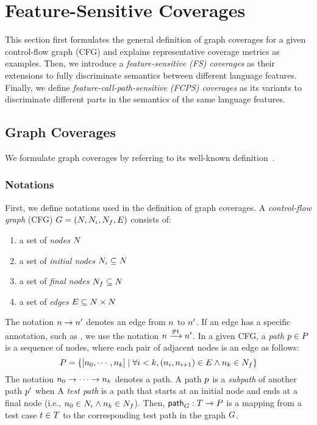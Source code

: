 \section{Feature-Sensitive Coverages}\label{sec:fscov}

This section first formulates the general definition of graph coverages for a
given control-flow graph (CFG) and explains representative coverage metrics as
examples.
%
Then, we introduce a \textit{feature-sensitive (FS) coverages} as their
extensions to fully discriminate semantics between different language features.
%
Finally, we define \textit{feature-call-path-sensitive (FCPS) coverages} as its
variants to discriminate different parts in the semantics of the same language
features.




\subsection{Graph Coverages}

We formulate graph coverages by referring to its well-known
definition~\cite{testing}.




\subsubsection{Notations}
%
First, we define notations used in the definition of graph coverages.
%
A \textit{control-flow graph} (CFG) $G = (N, N_\iota,
N_f, E)$ consists of:
\begin{enumerate}
  \item a set of \textit{nodes} $N$
  \item a set of \textit{initial nodes} $N_\iota \subseteq N$
  \item a set of \textit{final nodes} $N_f \subseteq N$
  \item a set of \textit{edges} $E \subseteq N \times N$
\end{enumerate}
%
The notation $n \rightarrow n'$ denotes an edge from $n$ to
$n'$.
%
If an edge has a specific annotation, such as , we use the notation
$n \xrightarrow{\textsf{\#t}} n'$.
%
In a given CFG, a \textit{path} $p \in P$ is a sequence of nodes, where
each pair of adjacent nodes is an edge as follows:
\[
  P = \{
    [n_0, \cdots, n_k] \mid
    \forall i < k, (n_i, n_{i+1}) \in E \wedge
    n_k \in N_f
  \}
\]
%
The notation $n_0 \rightarrow \cdots \rightarrow n_k$ denotes a path.
%
A path $p$ is a \textit{subpath} of another path $p'$ when 
%
A \textit{test path} is a path that starts at an initial node and ends at a
final node (i.e., $n_0 \in N_\iota \wedge n_k \in N_f$).
%
Then, $\textsf{path}_{G} : T \rightarrow P$ is a mapping from a test
case $t \in T$ to the corresponding test path in the graph $G$.

